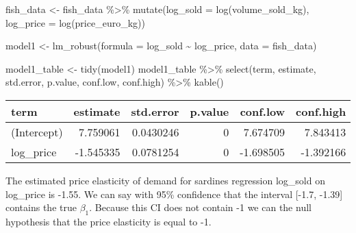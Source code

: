 \documentclass[
]{article}
\newenvironment{Shaded}{\begin{snugshade}}{\end{snugshade}}
\newcommand{\AttributeTok}[1]{\textcolor[rgb]{0.77,0.63,0.00}{#1}}
\newcommand{\FunctionTok}[1]{\textcolor[rgb]{0.00,0.00,0.00}{#1}}
\newcommand{\NormalTok}[1]{#1}
\newcommand{\OtherTok}[1]{\textcolor[rgb]{0.56,0.35,0.01}{#1}}
\newcommand{\SpecialCharTok}[1]{\textcolor[rgb]{0.00,0.00,0.00}{#1}}
\begin{document}
\begin{Shaded}
\begin{Highlighting}[]
\NormalTok{fish\_data }\OtherTok{\textless{}{-}}\NormalTok{ fish\_data }\SpecialCharTok{\%\textgreater{}\%} 
  \FunctionTok{mutate}\NormalTok{(}\AttributeTok{log\_sold =} \FunctionTok{log}\NormalTok{(volume\_sold\_kg),}
         \AttributeTok{log\_price =} \FunctionTok{log}\NormalTok{(price\_euro\_kg))}
\end{Highlighting}
\end{Shaded}

\begin{Shaded}
\begin{Highlighting}[]
\NormalTok{model1 }\OtherTok{\textless{}{-}} \FunctionTok{lm\_robust}\NormalTok{(}\AttributeTok{formula =}\NormalTok{ log\_sold }\SpecialCharTok{\textasciitilde{}}\NormalTok{ log\_price,}
             \AttributeTok{data =}\NormalTok{ fish\_data)}
\end{Highlighting}
\end{Shaded}

\begin{Shaded}
\begin{Highlighting}[]
\NormalTok{model1\_table }\OtherTok{\textless{}{-}} \FunctionTok{tidy}\NormalTok{(model1)}
\NormalTok{model1\_table }\SpecialCharTok{\%\textgreater{}\%}
  \FunctionTok{select}\NormalTok{(term, estimate, std.error, p.value, conf.low, conf.high) }\SpecialCharTok{\%\textgreater{}\%}
  \FunctionTok{kable}\NormalTok{()}
\end{Highlighting}
\end{Shaded}

\begin{longtable}[]{@{}lrrrrr@{}}
\toprule
term & estimate & std.error & p.value & conf.low & conf.high \\
\midrule
\endhead
(Intercept) & 7.759061 & 0.0430246 & 0 & 7.674709 & 7.843413 \\
log\_price & -1.545335 & 0.0781254 & 0 & -1.698505 & -1.392166 \\
\bottomrule
\end{longtable}

\noident The estimated price elasticity of demand for sardines
regression log\_sold on log\_price is -1.55. We can say with 95\%
confidence that the interval {[}-1.7, -1.39{]} contains the true
\(\beta_1\). Because this CI does not contain -1 we can the null
hypothesis that the price elasticity is equal to -1.
\end{document}
